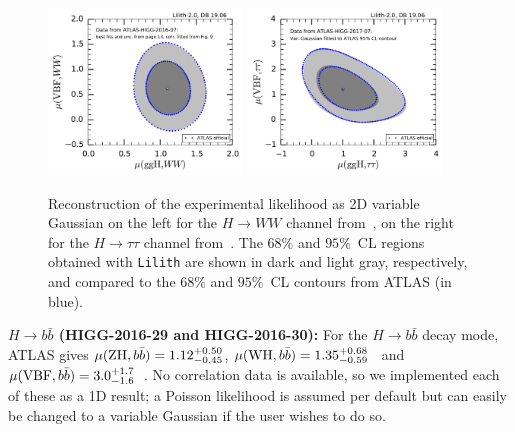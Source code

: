 \begin{figure}[h!]\centering
\includegraphics[width=0.46\textwidth]{validation/ATLAS/HIGG-2016-07-mu-2d.pdf}%
\includegraphics[width=0.46\textwidth]{validation/ATLAS/HIGG-2017-07-mu-2d.pdf}
\caption{Reconstruction of the experimental likelihood as 2D variable Gaussian %
on the left for the $H\to WW$ channel from~\cite{Aaboud:2018jqu},
on the right for the $H\to \tau\tau$ channel from~\cite{Aaboud:2018pen}.  
The  $68\%$ and $95\%$~CL regions obtained with {\tt Lilith} are shown in dark and light gray, respectively, 
and compared to the $68\%$ and  $95\%$~CL contours from ATLAS (in blue).}
\label{fig:validation_atlas_WW_tautau}
\end{figure}


{\bf\boldmath $H\to b\bar b$ (HIGG-2016-29 and HIGG-2016-30):} For the $H\to b\bar b$ decay mode, ATLAS gives 
$\mu({\rm ZH}, b\bar b) = 1.12^{+0.50}_{-0.45}$, $\mu({\rm WH}, b\bar b) = 1.35^{+0.68}_{-0.59}$~\cite{Aaboud:2018gay} 
and $\mu({\rm VBF}, b\bar b) = 3.0^{+1.7}_{-1.6}$~\cite{Aaboud:2018gay}. 
No correlation data is available, so we implemented each of these as a 1D result; 
a Poisson likelihood is assumed per default but can easily be changed to a variable Gaussian if the user wishes to do so. \\


